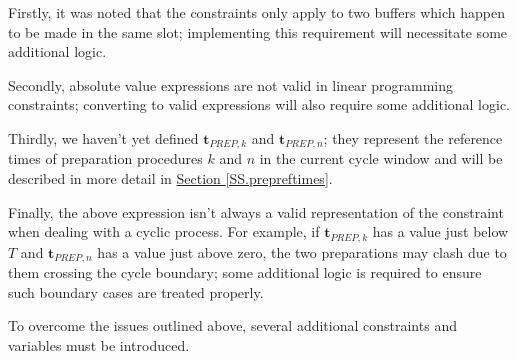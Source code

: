 Firstly, it was noted that the constraints only apply to two buffers which
happen to be made in the same slot; implementing this requirement will
necessitate some additional logic.

Secondly, absolute value expressions are not valid in linear programming
constraints; converting to valid expressions will also require some additional
logic.

Thirdly, we haven't yet defined $\boldsymbol{t}_{\mathit{PREP},k}$ and 
$\boldsymbol{t}_{\mathit{PREP},n}$; they represent the reference times of
preparation procedures $k$ and $n$ in the current cycle window and will be
described in more detail in 
\hyperref[SS.prepreftimes]{Section \ref*{SS.prepreftimes}}.

Finally, the above expression isn't always a valid representation of the
constraint when dealing with a cyclic process.
For example, if $\boldsymbol{t}_{\mathit{PREP},k}$ has a value just below $T$
and $\boldsymbol{t}_{\mathit{PREP},n}$ has a value just above zero, the two
preparations may clash due to them crossing the cycle boundary; some additional
logic is required to ensure such boundary cases are treated properly.

To overcome the issues outlined above, several additional constraints and
variables must be introduced.

